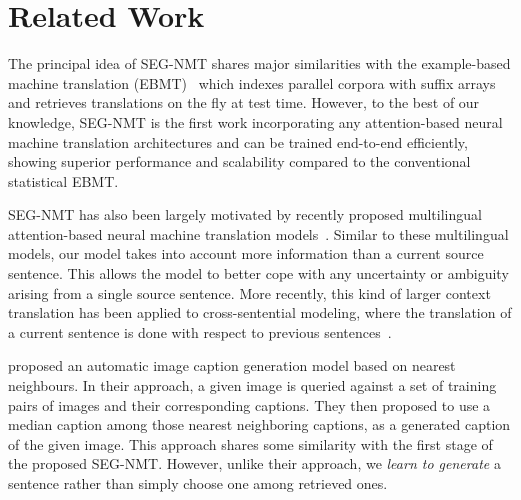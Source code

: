 \section{Related Work}

The principal idea of SEG-NMT shares major similarities with the example-based machine translation (EBMT)~\citep{Zhang2005AnEP,callison2005scaling,phillips2012modeling} which indexes parallel corpora with suffix arrays and retrieves translations on the fly at test time. However, to the best of our knowledge, SEG-NMT is the first work incorporating any attention-based neural machine translation architectures and can be trained end-to-end efficiently, showing superior performance and scalability compared to the conventional statistical EBMT. 


SEG-NMT has also been largely motivated by recently proposed multilingual attention-based neural machine translation models~\citep{firat2016multi,zoph2016multi}. Similar to these multilingual models, our model takes into account more information than a current source sentence. This allows the model to better cope with any uncertainty or ambiguity arising from a single source sentence. More recently, this kind of larger context translation has been applied to cross-sentential modeling, where the translation of a current sentence is done with respect to previous sentences~\citep{jean2017does,wang2017exploiting}. 


 proposed an automatic image caption generation model based on nearest neighbours. In their approach, a given image is queried against a set of training pairs of images and their corresponding captions. They then proposed to use a median caption among those nearest neighboring captions, as a generated caption of the given image. This approach shares some similarity with the first stage of the proposed SEG-NMT. However, unlike their approach, we {\it learn to generate} a sentence rather than simply choose one among retrieved ones. 

